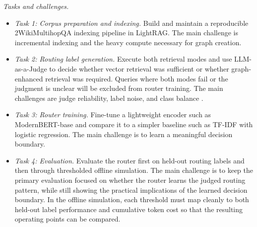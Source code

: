 \documentclass[11pt, a4paper]{article}
\begin{document}
\emph{Tasks and challenges.}
\begin{itemize}[label=--]
    \item \emph{Task 1: Corpus preparation and indexing.} Build and maintain a reproducible 2WikiMultihopQA indexing pipeline in LightRAG. The main challenge is incremental indexing and the heavy compute necessary for graph creation.
    \item \emph{Task 2: Routing label generation.} Execute both retrieval modes and use LLM-as-a-Judge to decide whether vector retrieval was sufficient or whether graph-enhanced retrieval was required. Queries where both modes fail or the judgment is unclear will be excluded from router training. The main challenges are judge reliability, label noise, and class balance \cite{zheng2023judge}.
    \item \emph{Task 3: Router training.} Fine-tune a lightweight encoder such as ModernBERT-base \cite{warner2024modernbert} and compare it to a simpler baseline such as TF-IDF with logistic regression. The main challenge is to learn a meaningful decision boundary.
    \item \emph{Task 4: Evaluation.} Evaluate the router first on held-out routing labels and then through thresholded offline simulation. The main challenge is to keep the primary evaluation focused on whether the router learns the judged routing pattern, while still showing the practical implications of the learned decision boundary. In the offline simulation, each threshold must map cleanly to both held-out label performance and cumulative token cost so that the resulting operating points can be compared.
\end{itemize}
\end{document}
